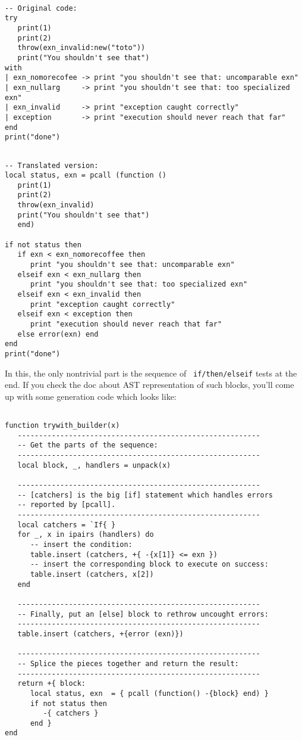 \begin{Verbatim}[fontsize=\scriptsize]

-- Original code:
try
   print(1)
   print(2)
   throw(exn_invalid:new("toto"))
   print("You shouldn't see that")
with
| exn_nomorecofee -> print "you shouldn't see that: uncomparable exn"
| exn_nullarg     -> print "you shouldn't see that: too specialized exn"
| exn_invalid     -> print "exception caught correctly"
| exception       -> print "execution should never reach that far"
end 
print("done")
\end{Verbatim}

\begin{Verbatim}[fontsize=\scriptsize]

-- Translated version:
local status, exn = pcall (function ()
   print(1)
   print(2)
   throw(exn_invalid)
   print("You shouldn't see that")
   end)

if not status then
   if exn < exn_nomorecoffee then
      print "you shouldn't see that: uncomparable exn"
   elseif exn < exn_nullarg then
      print "you shouldn't see that: too specialized exn"
   elseif exn < exn_invalid then
      print "exception caught correctly"
   elseif exn < exception then
      print "execution should never reach that far"
   else error(exn) end
end 
print("done")
\end{Verbatim}

In this, the only nontrivial part is the sequence of {\tt
  if/then/elseif} tests at the end. If you check the doc about AST
representation of such blocks, you'll come up with some generation
code which looks like:

\pagebreak

\begin{Verbatim}[fontsize=\scriptsize]

function trywith_builder(x)
   ---------------------------------------------------------
   -- Get the parts of the sequence:
   ---------------------------------------------------------
   local block, _, handlers = unpack(x)

   ---------------------------------------------------------
   -- [catchers] is the big [if] statement which handles errors
   -- reported by [pcall].
   ---------------------------------------------------------
   local catchers = `If{ }
   for _, x in ipairs (handlers) do
      -- insert the condition:
      table.insert (catchers, +{ -{x[1]} <= exn })
      -- insert the corresponding block to execute on success:
      table.insert (catchers, x[2])
   end

   ---------------------------------------------------------
   -- Finally, put an [else] block to rethrow uncought errors:
   ---------------------------------------------------------
   table.insert (catchers, +{error (exn)})

   ---------------------------------------------------------
   -- Splice the pieces together and return the result:
   ---------------------------------------------------------
   return +{ block:
      local status, exn  = { pcall (function() -{block} end) }
      if not status then
         -{ catchers }
      end }
end
\end{Verbatim}

